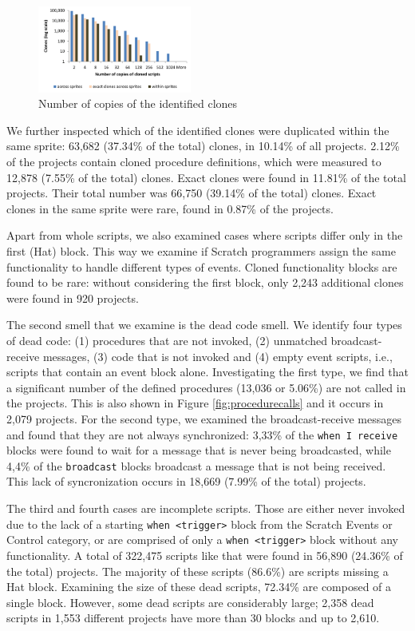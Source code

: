 \documentclass{sig-alternate-05-2015}
\begin{document}
\begin{figure}
	\centering
	\includegraphics[width=0.45\textwidth]{fig/charts/11clonescopies}
	\vspace{-1em}
	\caption{Number of copies of the identified clones}
	\label{fig:clonescopies}
\end{figure}

We further inspected which of the identified clones were duplicated within the same sprite: 63,682 (37.34\% of the total) clones, in 10.14\% of all projects. 2.12\% of the projects contain cloned procedure definitions, which were measured to 12,878 (7.55\% of the total) clones. Exact clones were found in 11.81\% of the total projects. Their total number was 66,750 (39.14\% of the total) clones. Exact clones in the same sprite were rare, found in 0.87\% of the projects.

Apart from whole scripts, we also examined cases where scripts differ only in the first (Hat) block. This way we examine if Scratch programmers assign the same functionality to handle different types of events. Cloned functionality blocks are found to be rare: without considering the first block, only 2,243 additional clones were found in 920 projects.

The second smell that we examine is the dead code smell. We identify four types of dead code: (1) procedures that are not invoked, (2) unmatched broadcast-receive messages, (3) code that is not invoked and (4) empty event scripts, i.e., scripts that contain an event block alone. Investigating the first type, we find that a significant number of the defined procedures (13,036 or 5.06\%) are not called in the projects. This is also shown in Figure \ref{fig:procedurecalls} and it occurs in 2,079 projects. For the second type, we examined the broadcast-receive messages and found that they are not always synchronized: 3,33\% of the \texttt{when I receive} blocks were found to wait for a message that is never being broadcasted, while 4,4\% of the \texttt{broadcast} blocks broadcast a message that is not being received. This lack of syncronization occurs in 18,669 (7.99\% of the total) projects.

The third and fourth cases are incomplete scripts. Those are either never invoked due to the lack of a starting \texttt{when <trigger>} block from the Scratch Events or Control category, or are comprised of only a \texttt{when <trigger>} block without any functionality. A total of 322,475 scripts like that were found in 56,890 (24.36\% of the total) projects. The majority of these scripts (86.6\%) are scripts missing a Hat block. Examining the size of these dead scripts, 72.34\% are composed of a single block. However, some dead scripts are considerably large; 2,358 dead scripts in 1,553 different projects have more than 30 blocks and up to 2,610.\footnotemark[\ref{repo}]
\end{document}
